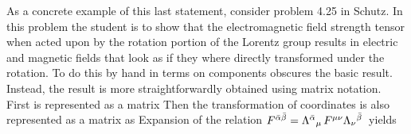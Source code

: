 \documentclass[12pt]{article}
\begin{document}
As a concrete example of this last statement, consider problem 4.25 in Schutz.  In this
problem the student is to show that the electromagnetic field strength tensor
 when acted upon by the rotation portion of the Lorentz group results in
electric and magnetic fields that look as if they where directly transformed under the
rotation.  To do this by hand in terms on components obscures the basic result.
Instead, the result is more straightforwardly obtained using matrix notation.
First  is represented as a matrix
\be
   \doteq {} \eqp
\ee
Then the transformation of coordinates is also represented as a matrix as
\be
  \op{\mR} \doteq {} \eqp
\ee
Expansion of the relation $F^{\bar \alpha\bar \beta} =  {\Lambda}{{}^{\bar \alpha} {}_{\mu} }  \, F^{\mu\nu}  {\Lambda}{{}_{\nu} {}^{\bar \beta} }  \,$
yields
\be
   \doteq  {}
\end{document}
